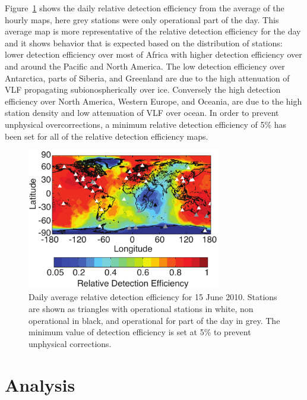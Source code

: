 Figure~\ref{efficiency:fig:Daily_Map} shows the daily relative detection efficiency from the average of the hourly maps, here grey stations were only operational part of the day.
This average map is more representative of the relative detection efficiency for the day and it shows behavior that is expected based on the distribution of stations: lower detection efficiency over most of Africa with higher detection efficiency over and around the Pacific and North America.
The low detection efficiency over Antarctica, parts of Siberia, and Greenland are due to the high attenuation of VLF propagating subionospherically over ice.
Conversely the high detection efficiency over North America, Western Europe, and Oceania, are due to the high station density and low attenuation of VLF over ocean.
In order to prevent unphysical overcorrections, a minimum relative detection efficiency of 5\% has been set for all of the relative detection efficiency maps.

\begin{figure}[ht!]
   \centering
\noindent\includegraphics[width=20pc]{efficiency/Figures/2012RS005049-p7.pdf} 
   \caption{Daily average relative detection efficiency for 15 June 2010.
Stations are shown as triangles with operational stations in white, non operational in black, and operational for part of the day in grey.
The minimum value of detection efficiency is set at 5\% to prevent unphysical corrections.}
   \label{efficiency:fig:Daily_Map}
\end{figure}

\section{Analysis}

